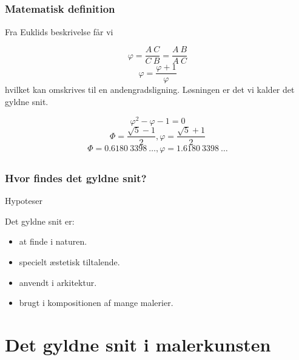 \documentclass[xcolor=table]{beamer}
\begin{document}
\subsection*{}
\begin{frame}

    \frametitle{Matematisk definition}

    Fra Euklids beskrivelse får vi

    \[
        \varphi = \frac{A\ C}{C\ B} = \frac{A\ B}{A\ C}
    \]
    \[
        \varphi = \frac{\varphi + 1}{\varphi}
    \]
    hvilket kan omskrives til en andengradsligning. Løsningen er det vi kalder det gyldne snit.

    \[
        \varphi^2 - \varphi -1 = 0
    \]
    \[
        \varPhi = \frac{\sqrt{5} - 1}{2}, \varphi = \frac{\sqrt{5} + 1}{2}
    \]
    \[
        \varPhi = 0.6180~3398~\ldots, \varphi = 1.6180~3398~\ldots
    \]

\end{frame}


\subsection*{}
\begin{frame}

    \frametitle{Hvor findes det gyldne snit?}

    \begin{block}{Hypoteser}

        Det gyldne snit er:

        \begin{itemize}
            \item <1> at finde i naturen.
            \item <1> specielt æstetisk tiltalende.
            \item <1> anvendt i arkitektur.
            \item <1-2> brugt i kompositionen af mange malerier.
        \end{itemize}

    \end{block}


\end{frame}

\section{Det gyldne snit i malerkunsten}
\end{document}
